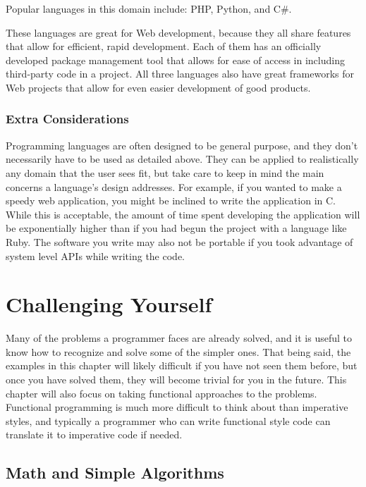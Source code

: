 \documentclass[12pt, oneside, a4paper]{book}
\begin{document}
         Popular languages in this domain include: PHP, Python, and C\#.

         These languages are great for Web development, because they all share features that allow for efficient, rapid development.
         Each of them has an officially developed package management tool that allows for ease of access in including third-party code in a project.
         All three languages also have great frameworks for Web projects that allow for even easier development of good products.
         \subsection{Extra Considerations}
         Programming languages are often designed to be general purpose, and they don't necessarily have to be used as detailed above.
         They can be applied to realistically any domain that the user sees fit, but take care to keep in mind the main concerns a language's design addresses.
         For example, if you wanted to make a speedy web application, you might be inclined to write the application in C.
         While this is acceptable, the amount of time spent developing the application will be exponentially higher than if you had begun the project with a language like Ruby.
         The software you write may also not be portable if you took advantage of system level APIs while writing the code.
         
   \chapter{Challenging Yourself}
   \label{chap:challenge}
      Many of the problems a programmer faces are already solved, and it is useful to know how to recognize and solve some of the simpler ones.
      That being said, the examples in this chapter will likely difficult if you have not seen them before, but once you have solved them, they will become trivial for you in the future.
      This chapter will also focus on taking functional approaches to the problems.
      Functional programming is much more difficult to think about than imperative styles, and typically a programmer who can write functional style code can translate it to imperative code if needed.

      \section{Math and Simple Algorithms}
\end{document}
